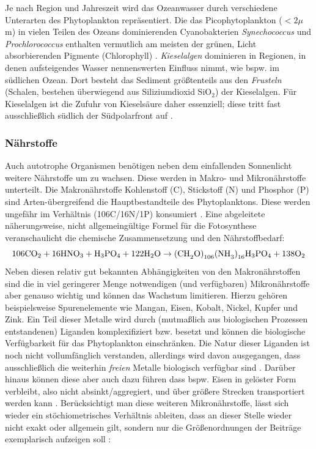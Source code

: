 \documentclass[12pt,a4paper,onecolumn,draft]{scrartcl}
\newcommand{\cotwo}{CO\textsubscript{2}}
\begin{document}
Je nach Region und Jahreszeit wird das Ozeanwasser durch verschiedene Unterarten des Phytoplankton repräsentiert. Die das Picophytoplankton ($<2\mu$m) in vielen Teilen des Ozeans dominierenden Cyanobakterien \textit{Synechococcus} und \textit{Prochlorococcus} enthalten vermutlich am meisten der grünen, Licht absorbierenden Pigmente (Chlorophyll) \citep{Emerson.2009}. \textit{Kieselalgen} dominieren in Regionen, in denen aufsteigendes Wasser nennenswerten Einfluss nimmt, wie bspw. im südlichen Ozean. Dort besteht das Sediment größtenteils aus den \textit{Frusteln} (Schalen, bestehen überwiegend aus Siliziumdioxid SiO$_2$) der Kieselalgen. Für Kieselalgen ist die Zufuhr von Kieselsäure daher essenziell; diese tritt fast ausschließlich südlich der Südpolarfront auf \citep{Falkowski.1998}.

\subsubsection{Nährstoffe} \label{sec:nährstoffe}
Auch autotrophe Organismen benötigen neben dem einfallenden Sonnenlicht weitere Nährstoffe um zu wachsen. Diese werden in Makro- und Mikronährstoffe unterteilt. Die Makronährstoffe Kohlenstoff (C), Stickstoff (N) und Phosphor (P) sind Arten-übergreifend die Hauptbestandteile des Phytoplanktons. Diese werden ungefähr im Verhältnis (106C/16N/1P) konsumiert \citep{Falkowski.1998}. Eine abgeleitete näherungsweise, nicht allgemeingültige Formel für die Fotosynthese  \citep{Emerson.2009} veranschaulicht die chemische Zusammensetzung und den Nährstoffbedarf:
\begin{equation}
\text{106\cotwo} + \text{16HNO}_3 + \text{H}_3\text{PO}_4 + \text{122H}_2\text{O} \rightarrow \text{(CH}_2\text{O)}_{106}\text{(NH}_3\text{)}_{16}\text{H}_3\text{PO}_4 + \text{138O}_2
\end{equation}
Neben diesen relativ gut bekannten Abhängigkeiten von den Makronährstoffen sind die in viel geringerer Menge notwendigen (und verfügbaren) Mikronährstoffe aber genauso wichtig und können das Wachstum limitieren. Hierzu gehören beispielsweise Spurenelemente wie Mangan, Eisen, Kobalt, Nickel, Kupfer und Zink. Ein Teil dieser Metalle wird durch (mutmaßlich aus biologischen Prozessen entstandenen) Liganden komplexifiziert bzw. besetzt und können die biologische Verfügbarkeit für das Phytoplankton einschränken. Die Natur dieser Liganden ist noch nicht vollumfänglich verstanden, allerdings wird davon ausgegangen, dass ausschließlich die weiterhin \textit{freien} Metalle biologisch verfügbar sind \citep{Emerson.2009}. Darüber hinaus können diese aber auch dazu führen dass bspw. Eisen in gelöster Form verbleibt, also nicht absinkt/aggregiert, und über größere Strecken transportiert werden kann \citep{Tagliabue.2017}. Berücksichtigt man diese weiteren Mikronährstoffe, lässt sich wieder ein stöchiometrisches Verhältnis ableiten, dass an dieser Stelle wieder nicht exakt oder allgemein gilt, sondern nur die Größenordnungen der Beiträge exemplarisch aufzeigen soll \citep{Emerson.2009}:
\end{document}
